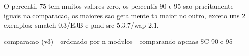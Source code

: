 
O percentil 75 tem muitos valores zero, os percentis 90 e 95 sao pracitamente iguais 
na comparacao, os maiores sao geralmente tb maior no outro, exceto uns 2 exemplos:
smatch-0.3/EJB e pmd-src-5.3.7/wap-2.1.




comparacao (v3) - ordenado por n modulos - comparando apenas SC 90 e 95
===============



